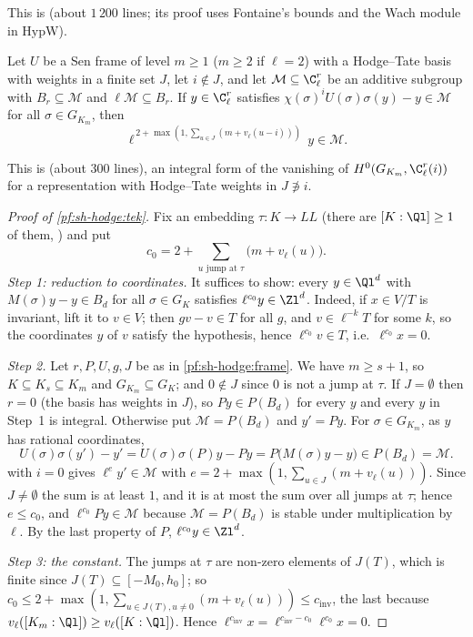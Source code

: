 This is  (about $1\,200$ lines; its proof uses Fontaine's bounds
 and the Wach module in $\mathrm{HypW}$).

\begin{lemma}\label{pf:sh-hodge:twinv}
Let $U$ be a Sen frame of level $m\ge1$ ($m\ge2$ if $\ell=2$) with a Hodge--Tate basis with weights in a finite set $J$, let $i\notin J$, and
let $\mathcal M\subseteq\C_\ell^r$ be an additive subgroup with $B_r\subseteq\mathcal M$ and $\ell\mathcal M\subseteq B_r$. If $y\in\C_\ell^r$ satisfies
$\chi(\sigma)^iU(\sigma)\sigma(y)-y\in\mathcal M$ for all $\sigma\in G_{K_m}$, then
\[
\ell^{\,2+\max(1,\sum_{u\in J}(m+v_\ell(u-i)))}\,y\in\mathcal M .
\]
\end{lemma}

This is  (about $300$ lines), an integral form of the
vanishing of $H^0(G_{K_m},\C_\ell^r(i))$ for a representation with Hodge--Tate weights in $J\not\ni i$.

\begin{proof}[Proof of \cref{pf:sh-hodge:tek}]
Fix an embedding $\tau\colon K\to\mathit{LL}$ (there are $[K:\Ql]\ge1$ of them, ) and put
\[
c_0=2+\sum_{u\text{ jump at }\tau}\bigl(m+v_\ell(u)\bigr).
\]
\emph{Step 1: reduction to coordinates.} It suffices to show: every $y\in\Ql^d$ with $M(\sigma)y-y\in B_d$ for all $\sigma\in G_K$ satisfies
$\ell^{c_0}y\in\Zl^d$. Indeed, if $x\in V/T$ is invariant, lift it to $v\in V$; then $gv-v\in T$ for all $g$, and $v\in\ell^{-k}T$ for some $k$, so
the coordinates $y$ of $v$ satisfy the hypothesis, hence $\ell^{c_0}v\in T$, i.e.\
$\ell^{c_0}x=0$.

\emph{Step 2.} Let $r,P,U,g,J$ be as in \cref{pf:sh-hodge:frame}. We have $m\ge s+1$, so $K\subseteq K_s\subseteq K_m$ and $G_{K_m}\subseteq G_K$; and
$0\notin J$ since $0$ is not a jump at $\tau$. If $J=\emptyset$ then $r=0$ (the basis has weights in $J$), so $Py\in P(B_d)$ for every $y$ and every
$y$ in Step~1 is integral. Otherwise put $\mathcal M=P(B_d)$ and $y'=Py$. For $\sigma\in G_{K_m}$, as $y$ has rational coordinates,
\[
U(\sigma)\sigma(y')-y'=U(\sigma)\sigma(P)y-Py=P\bigl(M(\sigma)y-y\bigr)\in P(B_d)=\mathcal M .
\]
 with $i=0$ gives $\ell^ey'\in\mathcal M$ with $e=2+\max(1,\sum_{u\in J}(m+v_\ell(u)))$. Since $J\ne\emptyset$ the sum is at
least $1$, and it is at most the sum over all jumps at $\tau$; hence $e\le c_0$, and $\ell^{c_0}Py\in\mathcal M$ because $\mathcal M=P(B_d)$ is stable
under multiplication by $\ell$. By the last property of $P$, $\ell^{c_0}y\in\Zl^d$.

\emph{Step 3: the constant.} The jumps at $\tau$ are non-zero elements of $J(T)$, which is finite since $J(T)\subseteq[-M_0,h_0]$; so $c_0\le
2+\max(1,\sum_{u\in J(T),u\ne0}(m+v_\ell(u)))\le c_{\mathrm{inv}}$, the last because $v_\ell([K_m:\Ql])\ge v_\ell([K:\Ql])$. Hence $\ell^{c_{\mathrm{inv}}}x=
\ell^{c_{\mathrm{inv}}-c_0}\ell^{c_0}x=0$.
\end{proof}


